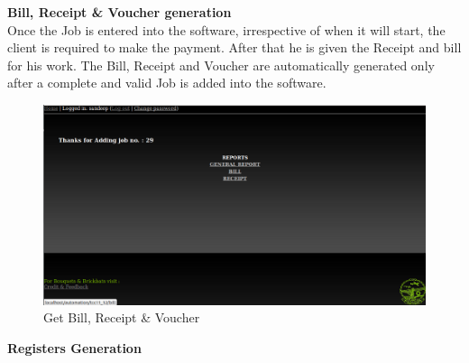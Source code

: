 \newpage
{\bf Bill, Receipt \& Voucher generation}\\

Once the Job is entered into the software, irrespective of when it will 
start, the client is required to make the payment. After that he is given 
the Receipt and bill for his work. The Bill, Receipt and Voucher are 
automatically generated only after a complete and valid Job is added 
into the software.
\begin{figure}[h]
\vskip 2cm
\centering \includegraphics[scale=1.0]{images/Bill.png}
\caption{Get Bill, Receipt \& Voucher}
\end{figure}

\newpage 
{\bf Registers Generation}\\

